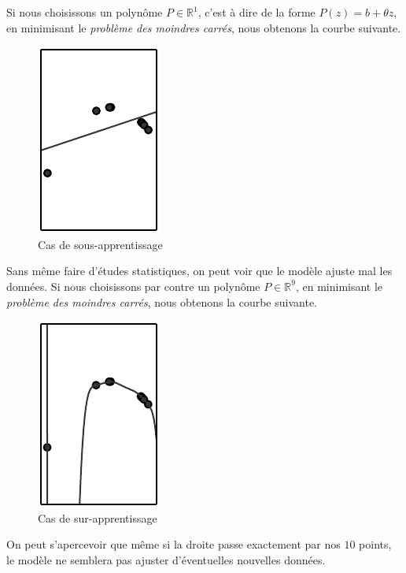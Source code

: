\documentclass[a4paper, 10pt]{report}
\begin{document}
			
Si nous choisissons un polynôme $P \in \mathbb{R}^1$, c'est à dire de la forme $P(z) = b + \theta z$, en minimisant le \emph{problème des moindres carrés}, nous obtenons la courbe suivante.
\begin{figure}[H]
	\begin{center}
		\includegraphics[scale=0.5]{Images/Underfitting.png}
		\caption{Cas de sous-apprentissage}			
	\end{center}
\end{figure}
Sans même faire d'études statistiques, on peut voir que le modèle ajuste mal les données.
Si nous choisissons par contre un polynôme $P \in \mathbb{R}^9$, en minimisant le \emph{problème des moindres carrés}, nous obtenons la courbe suivante.
\begin{figure}[H]
	\begin{center}
		\includegraphics[scale=0.5]{Images/Overfitting.png}
		\caption{Cas de sur-apprentissage}
	\end{center}
\end{figure}
On peut s'apercevoir que même si la droite passe exactement par nos $10$ points, le modèle ne semblera pas ajuster d'éventuelles nouvelles données.
			
\end{document}
